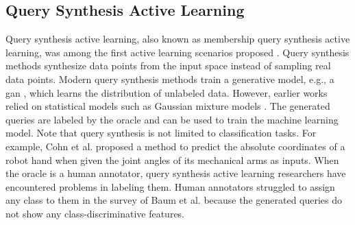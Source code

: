 \subsection{Query Synthesis Active Learning}
\label{sec:QuerySynthesisActiveLearning}
Query synthesis active learning, also known as membership query synthesis active learning, was among the first active learning scenarios proposed
\cite{angluin1988queries}. Query synthesis methods synthesize data points from the input space instead of sampling real data points. Modern query
synthesis methods train a generative model, e.g., a \gls{gan} \cite{zhu2017generative},
which learns the distribution of unlabeled data. However, earlier works relied on statistical models such as Gaussian mixture models 
\cite{cohn1996active}. The generated queries are labeled by the oracle and can be used to train the machine learning model. Note that
query synthesis is not limited to classification tasks. For example, Cohn et al. \cite{cohn1996active} proposed a method to predict the absolute coordinates
of a robot hand when given the joint angles of its mechanical arms as inputs. When the oracle is a human annotator, query synthesis active learning
researchers have encountered problems in labeling them. Human annotators struggled to assign any class to them in the survey of Baum et al. \cite{baum1992query}
because the generated queries do not show any class-discriminative features.


